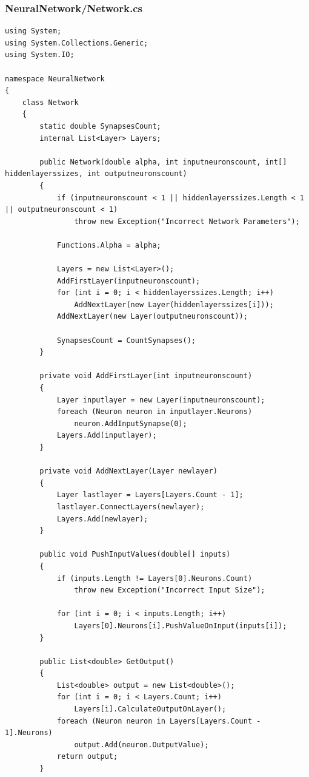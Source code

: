 \documentclass[12pt,a4paper]{article}
\begin{document}
	\vspace{20pt}	
	\subsubsection*{NeuralNetwork/Network.cs}
	\begin{lstlisting}
using System;
using System.Collections.Generic;
using System.IO;

namespace NeuralNetwork
{
    class Network
    {
        static double SynapsesCount;
        internal List<Layer> Layers;

        public Network(double alpha, int inputneuronscount, int[] hiddenlayerssizes, int outputneuronscount)
        {
            if (inputneuronscount < 1 || hiddenlayerssizes.Length < 1 || outputneuronscount < 1)
                throw new Exception("Incorrect Network Parameters");

            Functions.Alpha = alpha;

            Layers = new List<Layer>();
            AddFirstLayer(inputneuronscount);
            for (int i = 0; i < hiddenlayerssizes.Length; i++)
                AddNextLayer(new Layer(hiddenlayerssizes[i]));
            AddNextLayer(new Layer(outputneuronscount));

            SynapsesCount = CountSynapses();
        }

        private void AddFirstLayer(int inputneuronscount)
        {
            Layer inputlayer = new Layer(inputneuronscount);
            foreach (Neuron neuron in inputlayer.Neurons) 
                neuron.AddInputSynapse(0);
            Layers.Add(inputlayer);
        }

        private void AddNextLayer(Layer newlayer)
        {
            Layer lastlayer = Layers[Layers.Count - 1];
            lastlayer.ConnectLayers(newlayer);
            Layers.Add(newlayer);
        }

        public void PushInputValues(double[] inputs)
        {
            if (inputs.Length != Layers[0].Neurons.Count) 
                throw new Exception("Incorrect Input Size");

            for (int i = 0; i < inputs.Length; i++) 
                Layers[0].Neurons[i].PushValueOnInput(inputs[i]);
        }

        public List<double> GetOutput()
        {
            List<double> output = new List<double>();
            for (int i = 0; i < Layers.Count; i++)
                Layers[i].CalculateOutputOnLayer();
            foreach (Neuron neuron in Layers[Layers.Count - 1].Neurons)
                output.Add(neuron.OutputValue);
            return output;
        }


\end{lstlisting}
\end{document}
